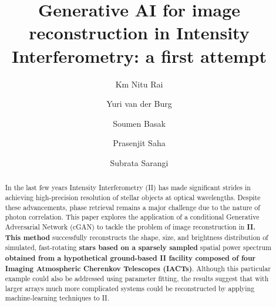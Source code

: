 \documentclass[linenumbers, twocolumn]{aastex701}
\begin{document}
\title{Generative AI for image reconstruction in Intensity Interferometry: a first attempt}

\author{Km Nitu Rai}

\author{Yuri van der Burg} 

\author{Soumen Basak}

\author{Prasenjit Saha}

\author{Subrata Sarangi}

\begin{abstract}
In the last few years Intensity Interferometry (II) has made significant strides in achieving high-precision resolution of stellar objects at optical wavelengths. Despite these advancements, phase retrieval remains a major challenge due to the nature of photon correlation. This paper explores the application of a conditional Generative Adversarial Network (cGAN) to tackle the problem of image reconstruction in \textbf{II. This method} successfully reconstructs the shape, size, and brightness distribution of simulated, fast-rotating \textbf{stars based on a sparsely sampled} spatial power spectrum \textbf{obtained from a hypothetical ground-based II facility composed of four Imaging Atmospheric Cherenkov Telescopes (IACTs)}.  Although this particular example could also be addressed using parameter fitting, the results suggest that with larger arrays much more complicated systems could be reconstructed by applying machine-learning techniques to II.
\end{abstract}
\end{document}
